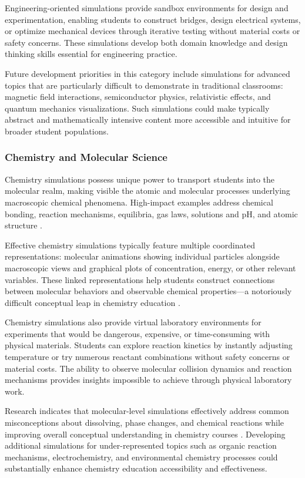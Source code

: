 Engineering-oriented simulations provide sandbox environments for design and experimentation, enabling students to construct bridges, design electrical systems, or optimize mechanical devices through iterative testing without material costs or safety concerns. These simulations develop both domain knowledge and design thinking skills essential for engineering practice.

Future development priorities in this category include simulations for advanced topics that are particularly difficult to demonstrate in traditional classrooms: magnetic field interactions, semiconductor physics, relativistic effects, and quantum mechanics visualizations. Such simulations could make typically abstract and mathematically intensive content more accessible and intuitive for broader student populations.

\subsubsection{Chemistry and Molecular Science}

Chemistry simulations possess unique power to transport students into the molecular realm, making visible the atomic and molecular processes underlying macroscopic chemical phenomena. High-impact examples address chemical bonding, reaction mechanisms, equilibria, gas laws, solutions and pH, and atomic structure \cite{phet2023}.

Effective chemistry simulations typically feature multiple coordinated representations: molecular animations showing individual particles alongside macroscopic views and graphical plots of concentration, energy, or other relevant variables. These linked representations help students construct connections between molecular behaviors and observable chemical properties—a notoriously difficult conceptual leap in chemistry education \cite{phet2023}.

Chemistry simulations also provide virtual laboratory environments for experiments that would be dangerous, expensive, or time-consuming with physical materials. Students can explore reaction kinetics by instantly adjusting temperature or try numerous reactant combinations without safety concerns or material costs. The ability to observe molecular collision dynamics and reaction mechanisms provides insights impossible to achieve through physical laboratory work.

Research indicates that molecular-level simulations effectively address common misconceptions about dissolving, phase changes, and chemical reactions while improving overall conceptual understanding in chemistry courses \cite{mdpi2024}. Developing additional simulations for under-represented topics such as organic reaction mechanisms, electrochemistry, and environmental chemistry processes could substantially enhance chemistry education accessibility and effectiveness.

